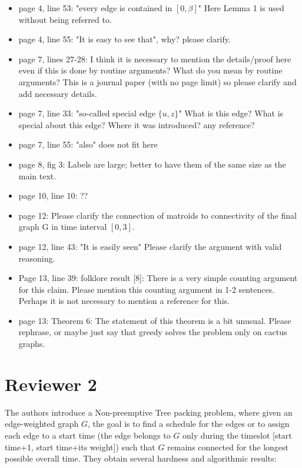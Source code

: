 \documentclass[11pt,a4paper]{article}
\begin{document}
\begin{itemize}
\item page 4, line 53: "every edge is contained in $[0, \beta]$" Here Lemma 1 is used without being referred to.

\item page 4, line 55: "It is easy to see that", why? please clarify.

\item page 7, lines 27-28: I think it is necessary to mention the details/proof here even if this is done by routine arguments? What do you mean by routine arguments? This is a journal paper (with no page limit) so please clarify and add necessary details.

\item page 7, line 33: "so-called special edge $\{u, z\}$" What is this edge? What is special about this edge? Where it was introduced? any reference? 

\item page 7, line 55: "also" does not fit here

\item page 8, fig 3: Labels are large; better to have them of the same size as the main text.

\item page 10, line 10: ??

\item page 12: Please clarify the connection of matroids to connectivity of the final graph G in time interval $[0,3]$.

\item page 12, line 43: "It is easily seen" Please clarify the argument with valid reasoning.

\item Page 13, line 39: folklore result [8]: There is a very simple counting argument for this claim. Please mention this counting argument in 1-2 sentences. Perhaps it is not necessary to mention a reference for this.

\item page 13: Theorem 6: The statement of this theorem is a bit unusual. Please rephrase, or maybe just say that greedy solves the problem only on cactus graphs.

\end{itemize}


\section*{Reviewer 2}

The authors introduce a Non-preemptive Tree packing problem, where given an edge-weighted graph $G$, the goal is to find a schedule for the edges or to assign each edge to a start time (the edge belongs to $G$ only during the timeslot [start time+1, start time+its weight]) such that $G$ remains connected for the longest possible overall time. They obtain several hardness and algorithmic results:
\end{document}
